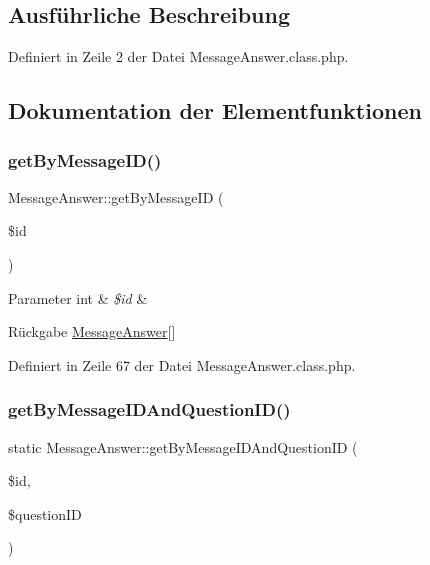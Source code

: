 \subsection{Ausführliche Beschreibung}


Definiert in Zeile 2 der Datei Message\+Answer.\+class.\+php.



\subsection{Dokumentation der Elementfunktionen}
\mbox{\label{class_message_answer_a880b6000aa29dd9a98eaf66d7d090eba}} 
\subsubsection{\texorpdfstring{get\+By\+Message\+I\+D()}{getByMessageID()}}
{\footnotesize\ttfamily Message\+Answer\+::get\+By\+Message\+ID (\begin{DoxyParamCaption}\item[{}]{\$id }\end{DoxyParamCaption})}


\begin{DoxyParams}[1]{Parameter}
int & {\em \$id} & \\
\hline
\end{DoxyParams}
\begin{DoxyReturn}{Rückgabe}
\mbox{\hyperlink{class_message_answer}{Message\+Answer}}\mbox{[}\mbox{]} 
\end{DoxyReturn}


Definiert in Zeile 67 der Datei Message\+Answer.\+class.\+php.

\mbox{\label{class_message_answer_a883af5afad6d2399954096c0a5fb25fb}} 
\subsubsection{\texorpdfstring{get\+By\+Message\+I\+D\+And\+Question\+I\+D()}{getByMessageIDAndQuestionID()}}
{\footnotesize\ttfamily static Message\+Answer\+::get\+By\+Message\+I\+D\+And\+Question\+ID (\begin{DoxyParamCaption}\item[{}]{\$id,  }\item[{}]{\$question\+ID }\end{DoxyParamCaption})\hspace{0.3cm}{\ttfamily [static]}}


